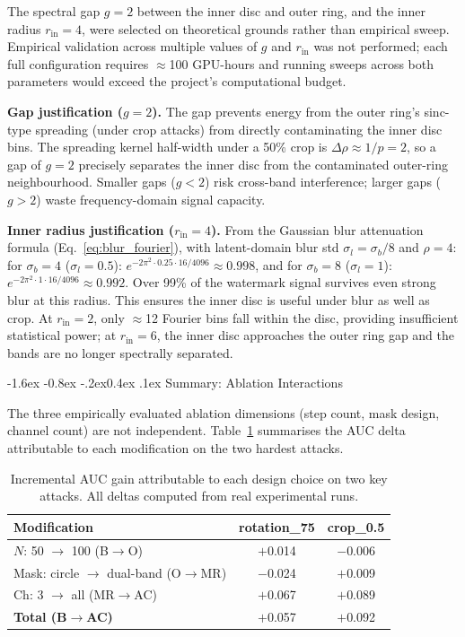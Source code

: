 \documentclass[10pt,twocolumn]{article}
\makeatletter
\renewcommand\subsection{\@startsection{subsection}{2}{\z@}%
  {-1.6ex \@plus -0.8ex \@minus -.2ex}{0.4ex \@plus .1ex}%
  {\normalfont\normalsize\itshape}}
\makeatother
\begin{document}
The spectral gap $g{=}2$ between the inner disc and outer ring, and
the inner radius $r_{\mathrm{in}}{=}4$, were selected on theoretical
grounds rather than empirical sweep.
Empirical validation across multiple values of $g$ and $r_{\mathrm{in}}$
was not performed; each full configuration requires $\approx$100 GPU-hours
and running sweeps across both parameters would exceed the project's
computational budget.

\textbf{Gap justification ($g{=}2$).}
The gap prevents energy from the outer ring's sinc-type spreading (under
crop attacks) from directly contaminating the inner disc bins.
The spreading kernel half-width under a 50\% crop is
$\Delta\rho \approx 1/p = 2$, so a gap of $g{=}2$ precisely separates
the inner disc from the contaminated outer-ring neighbourhood.
Smaller gaps ($g < 2$) risk cross-band interference; larger gaps
($g > 2$) waste frequency-domain signal capacity.

\textbf{Inner radius justification ($r_{\mathrm{in}}{=}4$).}
From the Gaussian blur attenuation formula (Eq.~\ref{eq:blur_fourier}),
with latent-domain blur std $\sigma_l{=}\sigma_b/8$ and $\rho{=}4$:
for $\sigma_b{=}4$ ($\sigma_l{=}0.5$):
$e^{-2\pi^2 \cdot 0.25 \cdot 16/4096} \approx 0.998$, and for
$\sigma_b{=}8$ ($\sigma_l{=}1$):
$e^{-2\pi^2 \cdot 1 \cdot 16/4096} \approx 0.992$.
Over 99\% of the watermark signal survives even strong blur at this radius.
This ensures the inner disc is useful under blur as well as crop.
At $r_{\mathrm{in}}{=}2$, only $\approx$12 Fourier bins fall within
the disc, providing insufficient statistical power; at $r_{\mathrm{in}}{=}6$,
the inner disc approaches the outer ring gap and the bands are
no longer spectrally separated.

\subsection{Summary: Ablation Interactions}

The three empirically evaluated ablation dimensions (step count,
mask design, channel count) are not independent.
Table~\ref{tab:ablation_summary} summarises the AUC delta attributable
to each modification on the two hardest attacks.

\begin{table}[htbp]
  \centering
  \caption{Incremental AUC gain attributable to each design choice
    on two key attacks. All deltas computed from real experimental runs.}
  \label{tab:ablation_summary}
  \setlength{\tabcolsep}{3pt}
  \small
  \begin{tabular}{lcc}
    \toprule
    \textbf{Modification} & \textbf{rotation\_75} & \textbf{crop\_0.5} \\
    \midrule
    $N$: 50 $\to$ 100 (B$\to$O)       & $+$0.014 & $-$0.006 \\
    Mask: circle $\to$ dual-band (O$\to$MR) & $-$0.024 & $+$0.009 \\
    Ch: 3 $\to$ all (MR$\to$AC)       & $+$0.067 & $+$0.089 \\
    \midrule
    \textbf{Total (B$\to$AC)}          & $+$0.057 & $+$0.092 \\
    \bottomrule
  \end{tabular}
\end{table}
\end{document}
